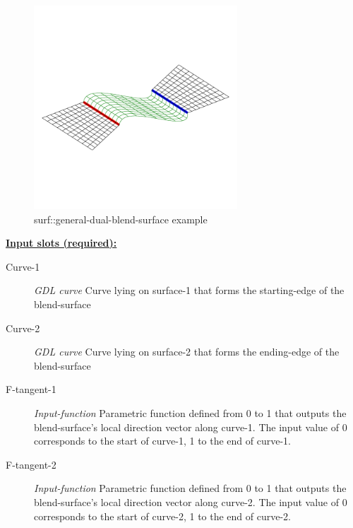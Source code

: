 \documentclass [11pt]{book}
\begin{document}
\begin{itemize}
\begin{figure}
\begin{center}
\includegraphics[width=3in,height=3in]{../images/example-surf::general-dual-blend-surface.pdf}
\end{center}

\caption{surf::general-dual-blend-surface example}

\label{fig:surf::general-dual-blend-surface}

\end{figure}





\textbf{
\underline{Input slots (required):}}

\begin{description}

\item [Curve-1]
\emph{GDL curve} Curve lying on surface-1 that forms the starting-edge of the blend-surface


\item [Curve-2]
\emph{GDL curve} Curve lying on surface-2 that forms the ending-edge of the blend-surface


\item [F-tangent-1]
\emph{Input-function} Parametric function defined from 0 to 1 that outputs the blend-surface's local direction vector along curve-1. The input value of 0 corresponds to the start of curve-1, 1 to the end of curve-1.


\item [F-tangent-2]
\emph{Input-function} Parametric function defined from 0 to 1 that outputs the blend-surface's local direction vector along curve-2. The input value of 0 corresponds to the start of curve-2, 1 to the end of curve-2.



\end{description}
\end{itemize}
\end{document}
